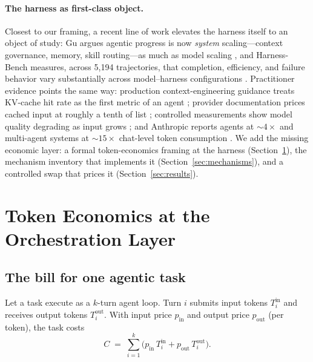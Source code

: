 \documentclass[11pt]{article}
\begin{document}
\paragraph{The harness as first-class object.} Closest to our framing, a recent line of work elevates the harness itself to an object of study: Gu argues agentic progress is now \emph{system} scaling---context governance, memory, skill routing---as much as model scaling \cite{harnessscaling}, and Harness-Bench measures, across 5{,}194 trajectories, that completion, efficiency, and failure behavior vary substantially across model--harness configurations \cite{harnessbench}. Practitioner evidence points the same way: production context-engineering guidance treats KV-cache hit rate as the first metric of an agent \cite{manus}; provider documentation prices cached input at roughly a tenth of list \cite{promptcache}; controlled measurements show model quality degrading as input grows \cite{contextrot}; and Anthropic reports agents at ${\sim}4\times$ and multi-agent systems at ${\sim}15\times$ chat-level token consumption \cite{anthmulti}. We add the missing economic layer: a formal token-economics framing at the harness (Section~\ref{sec:framing}), the mechanism inventory that implements it (Section~\ref{sec:mechanisms}), and a controlled swap that prices it (Section~\ref{sec:results}).

\section{Token Economics at the Orchestration Layer}
\label{sec:framing}

\subsection{The bill for one agentic task}

Let a task execute as a $k$-turn agent loop. Turn $i$ submits input tokens $T^{\mathrm{in}}_i$ and receives output tokens $T^{\mathrm{out}}_i$. With input price $p_{\mathrm{in}}$ and output price $p_{\mathrm{out}}$ (per token), the task costs
\begin{equation}
C \;=\; \sum_{i=1}^{k}\Big( p_{\mathrm{in}}\,T^{\mathrm{in}}_i + p_{\mathrm{out}}\,T^{\mathrm{out}}_i \Big).
\label{eq:cost}
\end{equation}
\end{document}
